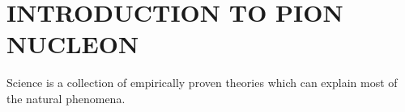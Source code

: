 \chapter{INTRODUCTION TO PION NUCLEON }


Science is a collection of empirically proven theories which can explain most of the natural phenomena.
